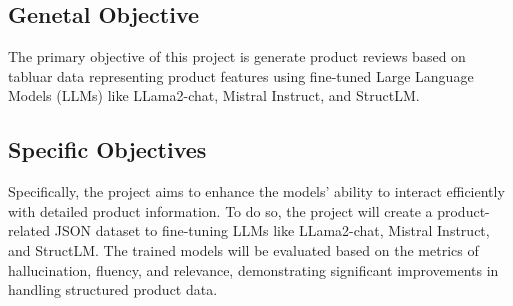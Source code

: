 \subsection{Genetal Objective}
The primary objective of this project is generate product reviews based on tabluar data representing product features using fine-tuned Large Language Models (LLMs) like LLama2-chat, Mistral Instruct, and StructLM.
\subsection{Specific Objectives}
Specifically, the project aims to enhance the models' ability to interact efficiently with detailed product information. To do so, the project will create a product-related JSON dataset to fine-tuning LLMs like LLama2-chat, Mistral Instruct, and StructLM. The trained models will be evaluated based on the metrics of hallucination, fluency, and relevance, demonstrating significant improvements in handling structured product data.